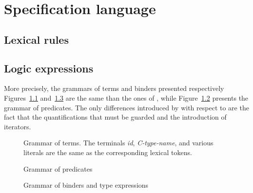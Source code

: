 
\chapter{Specification language}
\label{chap:base}


\section{Lexical rules}
\nodiff


\section{Logic expressions}
\label{sec:expressions}


More precisely, the grammars of terms and binders presented respectively
Figures~\ref{fig:gram:term} and~\ref{fig:gram:binders} are the same than the ones
of \acsl, while Figure~\ref{fig:gram:pred} presents the grammar of
predicates. The only differences introduced by \eacsl with respect to \acsl are
the fact that the quantifications that must be guarded and the introduction of
iterators.

\begin{figure}[htbp]
  \begin{cadre}
    
  \end{cadre}
  \caption{Grammar of terms. The terminals \emph{id}, \emph{C-type-name}, and
    various literals are the same as the corresponding \C lexical tokens.}
\label{fig:gram:term}
\end{figure}
\begin{figure}[htbp]
  \begin{cadre}
    
  \end{cadre}
  \caption{Grammar of predicates}
\label{fig:gram:pred}
\end{figure}
\begin{figure}[htbp]
  \caption{Grammar of binders and type expressions}
\label{fig:gram:binders}
\end{figure}

